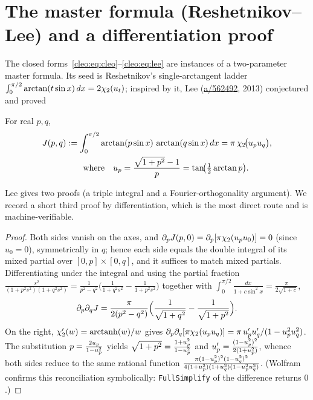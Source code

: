 \section{The master formula (Reshetnikov--Lee) and a differentiation proof}
The closed forms~\eqref{cleo:eq:cleo}--\eqref{cleo:eq:lee} are instances of a two-parameter master formula. Its
seed is Reshetnikov's single-arctangent ladder
$\int_0^{\pi/2}\arctan(t\sin x)\,dx=2\chi_2(u_t)$; inspired by it, Lee
(\href{https://math.stackexchange.com/a/562492}{a/562492}, 2013) conjectured and proved
\begin{theorem}[Lee 2013]\label{cleo:thm:master}
For real $p,q$,
\begin{equation}\label{cleo:eq:master}
\begin{aligned}
  J(p,q)&:=\int_0^{\pi/2}\arctan(p\sin x)\,\arctan(q\sin x)\,dx=\pi\,\chi_2\!\bigl(u_pu_q\bigr),\\
  &\qquad\text{where}\quad u_p=\frac{\sqrt{1+p^2}-1}{p}=\tan\!\bigl(\tfrac12\arctan p\bigr).
\end{aligned}
\end{equation}
\end{theorem}
Lee gives two proofs (a triple integral and a Fourier-orthogonality argument). We record a short third
proof by differentiation, which is the most direct route and is machine-verifiable.
\begin{proof}
Both sides vanish on the axes, and $\partial_pJ(p,0)=\partial_p[\pi\chi_2(u_p u_0)]=0$ (since $u_0=0$),
symmetrically in $q$; hence each side equals the double integral of its mixed partial over
$[0,p]\times[0,q]$, and it suffices to match mixed partials. Differentiating under the integral and using
the partial fraction $\frac{s^2}{(1+p^2s^2)(1+q^2s^2)}=\frac{1}{p^2-q^2}\bigl(\frac1{1+q^2s^2}-\frac1{1+p^2s^2}\bigr)$
together with $\int_0^{\pi/2}\frac{dx}{1+c\sin^2x}=\frac{\pi}{2\sqrt{1+c}}$,
\begin{equation}\label{cleo:eq:lhsmixed}
  \partial_p\partial_q J=\frac{\pi}{2(p^2-q^2)}\Bigl(\frac{1}{\sqrt{1+q^2}}-\frac{1}{\sqrt{1+p^2}}\Bigr).
\end{equation}
On the right, $\chi_2'(w)=\operatorname{arctanh}(w)/w$ gives
$\partial_p\partial_q[\pi\chi_2(u_pu_q)]=\pi\,u_p'u_q'/(1-u_p^2u_q^2)$. The substitution
$p=\frac{2u_p}{1-u_p^2}$ yields $\sqrt{1+p^2}=\frac{1+u_p^2}{1-u_p^2}$ and $u_p'=\frac{(1-u_p^2)^2}{2(1+u_p^2)}$,
whence both sides reduce to the same rational function
$\frac{\pi(1-u_p^2)^2(1-u_q^2)^2}{4(1+u_p^2)(1+u_q^2)(1-u_p^2u_q^2)}$. (Wolfram confirms this reconciliation
symbolically: \texttt{FullSimplify} of the difference returns $0$.)
\end{proof}


